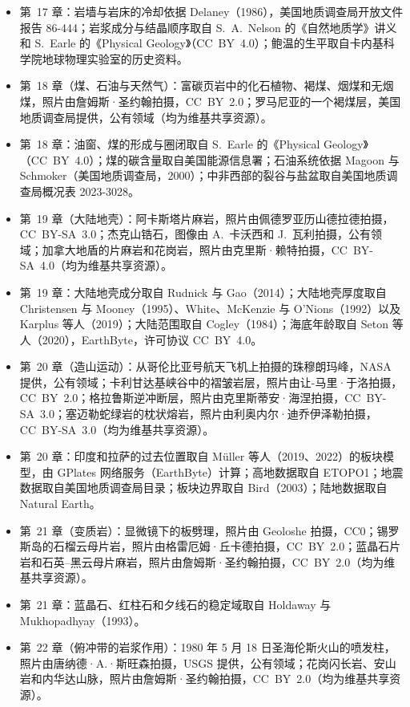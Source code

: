 \begin{itemize}
  \item 第~17 章：岩墙与岩床的冷却依据 Delaney（1986），美国地质调查局开放文件报告 86-444；岩浆成分与结晶顺序取自 S.~A.~Nelson 的《自然地质学》讲义和 S.~Earle 的《Physical Geology》（CC~BY~4.0）；鲍温的生平取自卡内基科学院地球物理实验室的历史资料。
  \item 第~18 章（煤、石油与天然气）：富碳页岩中的化石植物、褐煤、烟煤和无烟煤，照片由詹姆斯·圣约翰拍摄，CC~BY~2.0；罗马尼亚的一个褐煤层，美国地质调查局提供，公有领域（均为维基共享资源）。
  \item 第~18 章：油窗、煤的形成与圈闭取自 S.~Earle 的《Physical Geology》（CC~BY~4.0）；煤的碳含量取自美国能源信息署；石油系统依据 Magoon 与 Schmoker（美国地质调查局，2000）；中非西部的裂谷与盐盆取自美国地质调查局概况表 2023-3028。
  \item 第~19 章（大陆地壳）：阿卡斯塔片麻岩，照片由佩德罗亚历山德拉德拍摄，CC~BY-SA~3.0；杰克山锆石，图像由 A.~卡沃西和 J.~瓦利拍摄，公有领域；加拿大地盾的片麻岩和花岗岩，照片由克里斯·赖特拍摄，CC~BY-SA~4.0（均为维基共享资源）。
  \item 第~19 章：大陆地壳成分取自 Rudnick 与 Gao（2014）；大陆地壳厚度取自 Christensen 与 Mooney（1995）、White、McKenzie 与 O'Nions（1992）以及 Karplus 等人（2019）；大陆范围取自 Cogley（1984）；海底年龄取自 Seton 等人（2020），EarthByte，许可协议 CC~BY~4.0。
  \item 第~20 章（造山运动）：从哥伦比亚号航天飞机上拍摄的珠穆朗玛峰，NASA 提供，公有领域；卡利甘达基峡谷中的褶皱岩层，照片由让-马里·于洛拍摄，CC~BY~2.0；格拉鲁斯逆冲断层，照片由克里斯蒂安·海涅拍摄，CC~BY-SA~3.0；塞迈勒蛇绿岩的枕状熔岩，照片由利奥内尔·迪乔伊泽勒拍摄，CC~BY-SA~3.0（均为维基共享资源）。
  \item 第~20 章：印度和拉萨的过去位置取自 Müller 等人（2019、2022）的板块模型，由 GPlates 网络服务（EarthByte）计算；高地数据取自 ETOPO1；地震数据取自美国地质调查局目录；板块边界取自 Bird（2003）；陆地数据取自 Natural Earth。
  \item 第~21 章（变质岩）：显微镜下的板劈理，照片由 Geoloshe 拍摄，CC0；锡罗斯岛的石榴云母片岩，照片由格雷厄姆·丘卡德拍摄，CC~BY~2.0；蓝晶石片岩和石英--黑云母片麻岩，照片由詹姆斯·圣约翰拍摄，CC~BY~2.0（均为维基共享资源）。
  \item 第~21 章：蓝晶石、红柱石和夕线石的稳定域取自 Holdaway 与 Mukhopadhyay（1993）。
  \item 第~22 章（俯冲带的岩浆作用）：1980 年 5 月 18 日圣海伦斯火山的喷发柱，照片由唐纳德·A.·斯旺森拍摄，USGS 提供，公有领域；花岗闪长岩、安山岩和内华达山脉，照片由詹姆斯·圣约翰拍摄，CC~BY~2.0（均为维基共享资源）。

\end{itemize}
